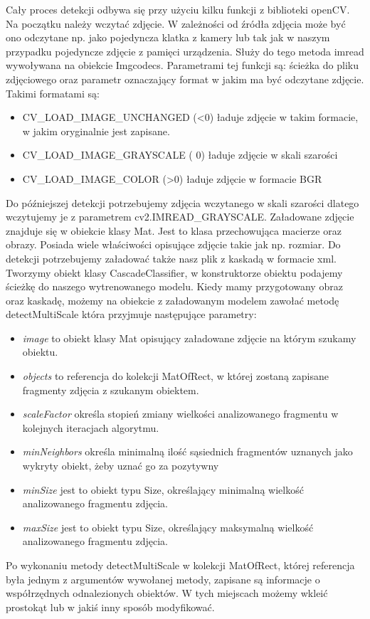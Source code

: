 Cały proces detekcji odbywa się przy użyciu kilku funkcji z biblioteki openCV. Na początku należy wczytać zdjęcie. W zależności od źródła zdjęcia może być ono odczytane np. jako pojedyncza klatka z kamery lub tak jak w naszym przypadku pojedyncze zdjęcie z pamięci urządzenia. Służy do tego metoda imread wywoływana na obiekcie Imgcodecs. Parametrami tej funkcji są: ścieżka do pliku zdjęciowego oraz parametr oznaczający format w jakim ma być odczytane zdjęcie. Takimi formatami są:
\begin{itemize}
	\item CV\_LOAD\_IMAGE\_UNCHANGED (\textless0) ładuje zdjęcie w takim formacie, w jakim oryginalnie jest zapisane.
	\item CV\_LOAD\_IMAGE\_GRAYSCALE ( 0) ładuje zdjęcie w skali szarości
	\item CV\_LOAD\_IMAGE\_COLOR (\textgreater0) ładuje zdjęcie w formacie BGR
\end{itemize}
Do późniejszej detekcji potrzebujemy zdjęcia wczytanego w skali szarości dlatego wczytujemy je z parametrem cv2.IMREAD\_GRAYSCALE.
Załadowane zdjęcie znajduje się w obiekcie klasy Mat. Jest to klasa przechowująca macierze oraz obrazy. Posiada wiele właściwości opisujące zdjęcie takie jak np. rozmiar.
Do detekcji potrzebujemy załadować także nasz plik z kaskadą w formacie xml. Tworzymy obiekt klasy CascadeClassifier, w konstruktorze obiektu podajemy ścieżkę do naszego wytrenowanego modelu. Kiedy mamy przygotowany obraz oraz kaskadę, możemy na obiekcie z załadowanym modelem zawołać metodę detectMultiScale która przyjmuje następujące parametry:
\begin{itemize}
	\item \textit{image} to obiekt klasy Mat opisujący załadowane zdjęcie na którym szukamy obiektu.
	\item \textit{objects} to referencja do kolekcji MatOfRect, w której zostaną zapisane fragmenty zdjęcia z szukanym obiektem.
	\item \textit{scaleFactor} określa stopień zmiany wielkości analizowanego fragmentu w kolejnych iteracjach algorytmu.
	\item \textit{minNeighbors} określa minimalną ilość sąsiednich fragmentów uznanych jako wykryty obiekt, żeby uznać go za pozytywny
	\item \textit{minSize} jest to obiekt typu Size, określający minimalną wielkość analizowanego fragmentu zdjęcia.
	\item \textit{maxSize} jest to obiekt typu Size, określający maksymalną wielkość analizowanego fragmentu zdjęcia.
\end{itemize}
Po wykonaniu metody detectMultiScale w kolekcji MatOfRect, której referencja była jednym z argumentów wywołanej metody, zapisane są informacje o współrzędnych odnalezionych obiektów. W tych miejscach możemy wkleić prostokąt lub w jakiś inny sposób modyfikować.
